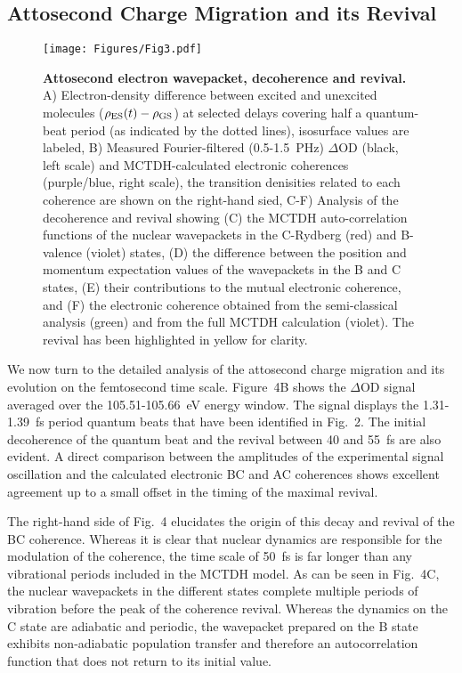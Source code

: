 \documentclass[12pt]{article}
\begin{document}
\subsection{Attosecond Charge Migration and its Revival} \label{AttoCM}
%
\begin{figure}
    \centering
    \texttt{[image: Figures/Fig3.pdf]}
    \caption{
    \textbf{Attosecond electron wavepacket, decoherence and revival.} A)  Electron-density difference between excited and unexcited molecules ($\rho_{\rm ES}(t)-\rho_{\rm GS}$) at selected delays covering half a quantum-beat period (as indicated by the dotted lines), isosurface values are labeled, B) Measured Fourier-filtered (0.5-1.5~PHz) $\Delta$OD (black, left scale) and MCTDH-calculated electronic coherences (purple/blue, right scale), the transition denisities related to each coherence are shown on the right-hand sied, C-F) Analysis of the decoherence and revival showing (C) the MCTDH auto-correlation functions of the nuclear wavepackets in the C-Rydberg (red) and B-valence (violet) states, (D) the difference between the position and momentum expectation values of the wavepackets in the B and C states, (E) their contributions to the mutual electronic coherence, and (F) the electronic coherence obtained from the semi-classical analysis (green) and from the full MCTDH calculation (violet). The revival has been highlighted in yellow for clarity.
    }
\end{figure}
%
We now turn to the detailed analysis of the attosecond charge migration and its evolution on the femtosecond time scale. Figure~4B shows the $\Delta$OD signal averaged over the 105.51-105.66~eV energy window. The signal displays the 1.31-1.39~fs period quantum beats that have been identified in Fig.~2. The initial decoherence of the quantum beat and the revival between 40 and 55~fs are also evident. A direct comparison between the amplitudes of the experimental signal oscillation and the calculated electronic BC and AC coherences shows excellent agreement up to a small offset in the timing of the maximal revival. %

The right-hand side of Fig.~4 elucidates the origin of this decay and revival of the BC coherence. Whereas it is clear that nuclear dynamics are responsible for the modulation of the coherence, the time scale of 50~fs is far longer than any vibrational periods included in the MCTDH model. As can be seen in Fig.~4C, the nuclear wavepackets in the different states complete multiple periods of vibration before the peak of the coherence revival. Whereas the dynamics on the C state are adiabatic and periodic, the wavepacket prepared on the B state exhibits non-adiabatic population transfer and therefore an autocorrelation function that does not return to its initial value. 
\end{document}
